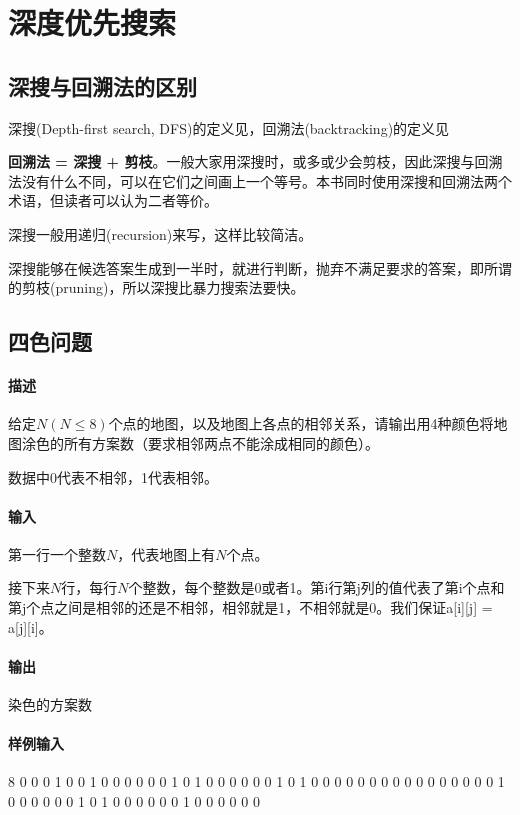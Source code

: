 \chapter{深度优先搜索}


\section{深搜与回溯法的区别}
深搜(Depth-first search, DFS)的定义见，回溯法(backtracking)的定义见

\textbf{回溯法 = 深搜 + 剪枝}。一般大家用深搜时，或多或少会剪枝，因此深搜与回溯法没有什么不同，可以在它们之间画上一个等号。本书同时使用深搜和回溯法两个术语，但读者可以认为二者等价。

深搜一般用递归(recursion)来写，这样比较简洁。

深搜能够在候选答案生成到一半时，就进行判断，抛弃不满足要求的答案，即所谓的剪枝(pruning)，所以深搜比暴力搜索法要快。


\section{四色问题} %

\subsubsection{描述}
给定$N(N \leq 8)$个点的地图，以及地图上各点的相邻关系，请输出用4种颜色将地图涂色的所有方案数（要求相邻两点不能涂成相同的颜色）。

数据中0代表不相邻，1代表相邻。

\subsubsection{输入}
第一行一个整数$N$，代表地图上有$N$个点。

接下来$N$行，每行$N$个整数，每个整数是0或者1。第i行第j列的值代表了第i个点和第j个点之间是相邻的还是不相邻，相邻就是1，不相邻就是0。我们保证a[i][j] = a[j][i]。

\subsubsection{输出}
染色的方案数

\subsubsection{样例输入}
\begin{Code}
8
0 0 0 1 0 0 1 0 
0 0 0 0 0 1 0 1 
0 0 0 0 0 0 1 0 
1 0 0 0 0 0 0 0 
0 0 0 0 0 0 0 0 
0 1 0 0 0 0 0 0 
1 0 1 0 0 0 0 0 
0 1 0 0 0 0 0 0
\end{Code}

